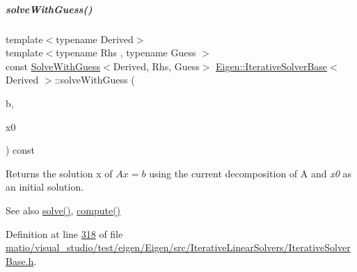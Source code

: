 \mbox{\label{group___iterative_linear_solvers___module_adcc18d1ab283786dcbb5a3f63f4b4bd8}} 
\subparagraph{\texorpdfstring{solve\+With\+Guess()}{solveWithGuess()}\hspace{0.1cm}{\footnotesize\ttfamily [1/2]}}
{\footnotesize\ttfamily template$<$typename Derived$>$ \\
template$<$typename Rhs , typename Guess $>$ \\
const \hyperlink{group___iterative_linear_solvers___module_class_eigen_1_1_solve_with_guess}{Solve\+With\+Guess}$<$Derived, Rhs, Guess$>$ \hyperlink{group___iterative_linear_solvers___module_class_eigen_1_1_iterative_solver_base}{Eigen\+::\+Iterative\+Solver\+Base}$<$ Derived $>$\+::solve\+With\+Guess (\begin{DoxyParamCaption}\item[{const \hyperlink{group___core___module_class_eigen_1_1_matrix_base}{Matrix\+Base}$<$ Rhs $>$ \&}]{b,  }\item[{const Guess \&}]{x0 }\end{DoxyParamCaption}) const\hspace{0.3cm}{\ttfamily [inline]}}

\begin{DoxyReturn}{Returns}
the solution x of $ A x = b $ using the current decomposition of A and {\itshape x0} as an initial solution.
\end{DoxyReturn}
\begin{DoxySeeAlso}{See also}
\hyperlink{group___sparse_core___module_a4a66e9498b06e3ec4ec36f06b26d4e8f}{solve()}, \hyperlink{group___iterative_linear_solvers___module_a7dfa55c55e82d697bde227696a630914}{compute()} 
\end{DoxySeeAlso}


Definition at line \hyperlink{matio_2visual__studio_2test_2eigen_2_eigen_2src_2_iterative_linear_solvers_2_iterative_solver_base_8h_source_l00318}{318} of file \hyperlink{matio_2visual__studio_2test_2eigen_2_eigen_2src_2_iterative_linear_solvers_2_iterative_solver_base_8h_source}{matio/visual\+\_\+studio/test/eigen/\+Eigen/src/\+Iterative\+Linear\+Solvers/\+Iterative\+Solver\+Base.\+h}.

